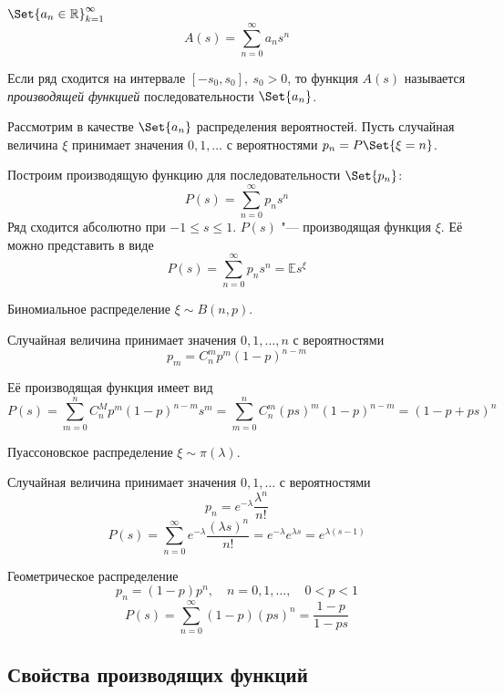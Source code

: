 \begin{definition}
	$ \Set{a_n \in \mathbb R}_{k = 1}^\infty $
	$$ A(s) = \sum_{n = 0}^\infty a_ns^n $$

	Если ряд сходится на интервале $ [-s_0, s_0], ~ s_0 > 0 $, то функция $ A(s) $ называется
	\emph{производящей функцией} последовательности $ \Set{a_n} $.
\end{definition}

Рассмотрим в качестве $ \Set{a_n} $ распределения вероятностей.
Пусть случайная величина $ \xi $ принимает значения $ 0, 1, \dotsc $ с вероятностями
$ p_n = P\Set{\xi = n} $.

Построим производящую функцию для последовательности $ \Set{p_n} $:
$$ P(s) = \sum_{n = 0}^\infty p_ns^n $$
Ряд сходится абсолютно при $ -1 \le s \le 1 $.
$ P(s) $ "--- производящая функция $ \xi $.
Её можно представить в виде
$$ P(s) = \sum_{n = 0}^\infty p_ns^n = \mathbb Es^\xi $$

\begin{exmpls}
\item Биномиальное распределение $ \xi \sim B(n, p) $.

	Случайная величина принимает значения $ 0, 1, \dots, n $ с вероятностями
	$$ p_m = C_n^m p^m(1 - p)^{n - m} $$
	
	Её производящая функция имеет вид
	$$ P(s) = \sum_{m = 0}^n C_n^M p^m(1 - p)^{n - m}s^m =
	\sum_{m = 0}^n C_n^m (ps)^m (1 - p)^{n - m} = (1 - p + ps)^n $$
\item Пуассоновское распределение $ \xi \sim \pi(\lambda) $.

	Случайная величина принимает значения $ 0, 1, \dotsc $ с вероятностями
	$$ p_n = e^{-\lambda} \frac{\lambda^n}{n!} $$
	$$ P(s) = \sum_{n = 0}^\infty e^{-\lambda} \frac{(\lambda s)^n}{n!} =
	e^{-\lambda}e^{\lambda s} = e^{\lambda (s - 1)} $$
\item Геометрическое распределение
	$$ p_n = (1 - p)p^n, \quad n = 0, 1, \dots, \quad 0 < p < 1 $$
	$$ P(s) = \sum_{n = 0}^\infty (1 - p)(ps)^n = \frac{1 - p}{1 - ps} $$
\end{exmpls}

\subsection{Свойства производящих функций}

